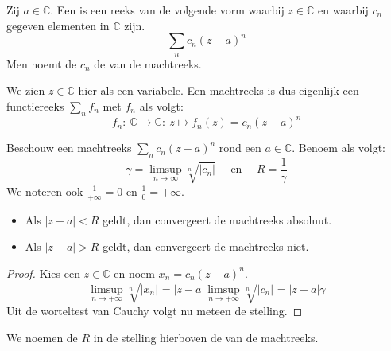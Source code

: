 \documentclass[main.tex]{subfiles}
\begin{document}
\begin{de}
  Zij $a \in \mathbb{C}$.
  Een  is een reeks van de volgende vorm waarbij $z\in\mathbb{C}$ en waarbij $c_{n}$ gegeven elementen in $\mathbb{C}$ zijn.
  \[ \sum_{n}c_{n}(z-a)^{n} \]
  Men noemt de $c_{n}$ de  van de machtreeks.
\end{de}

\begin{opm}
  We zien $z \in \mathbb{C}$ hier als een variabele.
  Een machtreeks is dus eigenlijk een functiereeks $\sum_{n}f_{n}$ met $f_{n}$ als volgt:
  \[ f_{n}:\ \mathbb{C} \rightarrow \mathbb{C}:\ z \mapsto f_{n}(z) = c_{n}(z-a)^{n} \]
\end{opm}

\begin{bst}
  Beschouw een machtreeks $\sum_{n}c_{n}(z-a)^{n}$ rond een $a\in \mathbb{C}$.
  Benoem als volgt:
  \[ \gamma = \limsup_{n \rightarrow \infty}\sqrt[n]{|c_{n}|} \quad\text{ en }\quad R = \frac{1}{\gamma} \]
  We noteren ook $\frac{1}{+\infty}=0$ en $\frac{1}{0} = +\infty$.
  \begin{itemize}
  \item Als $|z-a| < R$ geldt, dan convergeert de machtreeks absoluut.
  \item Als $|z-a| > R$ geldt, dan convergeert de machtreeks niet.
  \end{itemize}

  \begin{proof}
    Kies een $z\in \mathbb{C}$ en noem $x_{n}=c_{n}(z-a)^{n}$.
    \[ \limsup_{n\rightarrow +\infty}\sqrt[n]{|x_{n}|} = |z-a|\limsup_{n\rightarrow +\infty}\sqrt[n]{|c_{n}|} = |z-a|\gamma \]
    Uit de worteltest van Cauchy volgt nu meteen de stelling.
  \end{proof}
\end{bst}


\begin{de}
  We noemen de $R$ in de stelling hierboven de  van de machtreeks.
\end{de}

\end{document}
